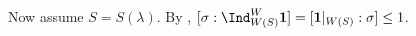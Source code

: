 \documentclass[counting_main.tex]{subfiles}
\begin{document}
{Now assume $S=S(\lambda)$. By \cite[Cor~5.30 b) and c)]{BVUni},
$[\sigma: \Ind_{W(S)}^{W}\bfone]=[\bfone|_{W(S)}:\sigma]\leq 1$.

}












\end{document}
